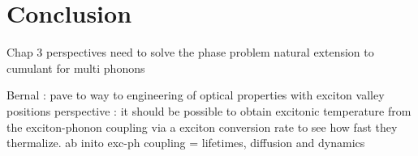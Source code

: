 \chapter*{Conclusion}


Chap 3
perspectives
need to solve the phase problem 
natural extension to cumulant for multi phonons

Bernal : pave to way to engineering of optical properties with exciton valley positions
% 
perspective : it should be possible to obtain excitonic temperature from the exciton-phonon coupling via a exciton conversion rate to see how fast they thermalize.
ab inito exc-ph coupling = lifetimes, diffusion and dynamics